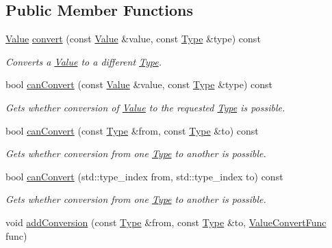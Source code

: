 \subsection*{Public Member Functions}
\begin{DoxyCompactItemize}
\item 
\hyperlink{classdg_1_1deepcore_1_1_value}{Value} \hyperlink{classdg_1_1deepcore_1_1_conversion_ac832e8fb2f28829c47066c0fd0021394}{convert} (const \hyperlink{classdg_1_1deepcore_1_1_value}{Value} \&value, const \hyperlink{classdg_1_1deepcore_1_1_type}{Type} \&type) const 
\begin{DoxyCompactList}\small\item\em Converts a \hyperlink{classdg_1_1deepcore_1_1_value}{Value} to a different \hyperlink{classdg_1_1deepcore_1_1_type}{Type}. \end{DoxyCompactList}\item 
bool \hyperlink{classdg_1_1deepcore_1_1_conversion_a65e1c7f5a3e0da5f7f2089c62e3d4ec9}{can\+Convert} (const \hyperlink{classdg_1_1deepcore_1_1_value}{Value} \&value, const \hyperlink{classdg_1_1deepcore_1_1_type}{Type} \&type) const 
\begin{DoxyCompactList}\small\item\em Gets whether conversion of \hyperlink{classdg_1_1deepcore_1_1_value}{Value} to the requested \hyperlink{classdg_1_1deepcore_1_1_type}{Type} is possible. \end{DoxyCompactList}\item 
bool \hyperlink{classdg_1_1deepcore_1_1_conversion_a0d7831bed4cf2b2dcfde144e712a2512}{can\+Convert} (const \hyperlink{classdg_1_1deepcore_1_1_type}{Type} \&from, const \hyperlink{classdg_1_1deepcore_1_1_type}{Type} \&to) const 
\begin{DoxyCompactList}\small\item\em Gets whether conversion from one \hyperlink{classdg_1_1deepcore_1_1_type}{Type} to another is possible. \end{DoxyCompactList}\item 
bool \hyperlink{classdg_1_1deepcore_1_1_conversion_a5b98ba47581be6d2cf8b23a87fb4d23c}{can\+Convert} (std\+::type\+\_\+index from, std\+::type\+\_\+index to) const 
\begin{DoxyCompactList}\small\item\em Gets whether conversion from one \hyperlink{classdg_1_1deepcore_1_1_type}{Type} to another is possible. \end{DoxyCompactList}\item 
void \hyperlink{classdg_1_1deepcore_1_1_conversion_a636c8b26f4e93070c1473be5318e6ccf}{add\+Conversion} (const \hyperlink{classdg_1_1deepcore_1_1_type}{Type} \&from, const \hyperlink{classdg_1_1deepcore_1_1_type}{Type} \&to, \hyperlink{group___process_type_ga213a2a633d6658f67842bd2958c82c78}{Value\+Convert\+Func} func)

\end{DoxyCompactItemize}
